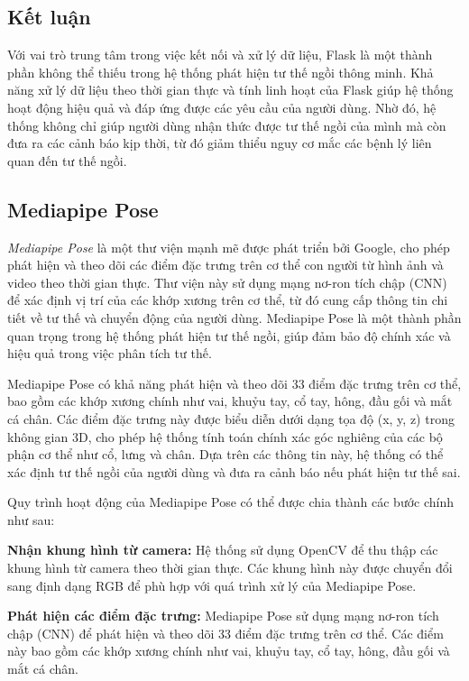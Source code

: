 \documentclass[conference]{IEEEtran}
\begin{document}
\subsection{Kết luận}
Với vai trò trung tâm trong việc kết nối và xử lý dữ liệu, Flask là một thành phần không thể thiếu trong hệ thống phát hiện tư thế ngồi thông minh. Khả năng xử lý dữ liệu theo thời gian thực và tính linh hoạt của Flask giúp hệ thống hoạt động hiệu quả và đáp ứng được các yêu cầu của người dùng. Nhờ đó, hệ thống không chỉ giúp người dùng nhận thức được tư thế ngồi của mình mà còn đưa ra các cảnh báo kịp thời, từ đó giảm thiểu nguy cơ mắc các bệnh lý liên quan đến tư thế ngồi.

\subsection{Mediapipe Pose}
\textit{Mediapipe Pose} là một thư viện mạnh mẽ được phát triển bởi Google, cho phép phát hiện và theo dõi các điểm đặc trưng trên cơ thể con người từ hình ảnh và video theo thời gian thực. Thư viện này sử dụng mạng nơ-ron tích chập (CNN) để xác định vị trí của các khớp xương trên cơ thể, từ đó cung cấp thông tin chi tiết về tư thế và chuyển động của người dùng. Mediapipe Pose là một thành phần quan trọng trong hệ thống phát hiện tư thế ngồi, giúp đảm bảo độ chính xác và hiệu quả trong việc phân tích tư thế.

Mediapipe Pose có khả năng phát hiện và theo dõi 33 điểm đặc trưng trên cơ thể, bao gồm các khớp xương chính như vai, khuỷu tay, cổ tay, hông, đầu gối và mắt cá chân. Các điểm đặc trưng này được biểu diễn dưới dạng tọa độ (x, y, z) trong không gian 3D, cho phép hệ thống tính toán chính xác góc nghiêng của các bộ phận cơ thể như cổ, lưng và chân. Dựa trên các thông tin này, hệ thống có thể xác định tư thế ngồi của người dùng và đưa ra cảnh báo nếu phát hiện tư thế sai.

Quy trình hoạt động của Mediapipe Pose có thể được chia thành các bước chính như sau:

\textbf{Nhận khung hình từ camera:} Hệ thống sử dụng OpenCV để thu thập các khung hình từ camera theo thời gian thực. Các khung hình này được chuyển đổi sang định dạng RGB để phù hợp với quá trình xử lý của Mediapipe Pose.
 
 \textbf{Phát hiện các điểm đặc trưng:} Mediapipe Pose sử dụng mạng nơ-ron tích chập (CNN) để phát hiện và theo dõi 33 điểm đặc trưng trên cơ thể. Các điểm này bao gồm các khớp xương chính như vai, khuỷu tay, cổ tay, hông, đầu gối và mắt cá chân.
 
\end{document}
